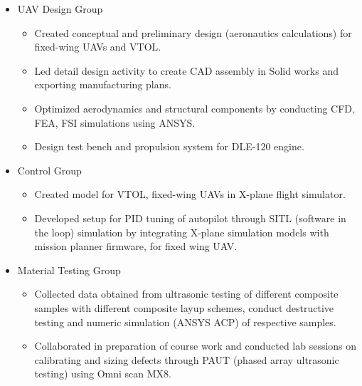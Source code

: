 \documentclass[margin, 10pt]{res} %
\begin{document}
\begin{resume}
\begin{itemize}
\item UAV Design Group

   \begin{itemize}
    \item Created conceptual and preliminary design (aeronautics calculations) for fixed-wing UAVs and VTOL. 
    \item Led detail design activity to create CAD assembly in Solid works and exporting manufacturing plans.
    \item Optimized aerodynamics and structural components by conducting CFD, FEA, FSI simulations using ANSYS. %
    \item Design test bench and propulsion system for DLE-120 engine. 
    \end{itemize}

\item Control Group

    \begin{itemize}
    \item Created model for VTOL, fixed-wing UAVs in X-plane flight simulator.
    \item Developed setup for PID tuning of autopilot through SITL (software in the loop) simulation by integrating X-plane simulation models with mission planner firmware, for fixed wing UAV.
    \end{itemize} 
    


\item Material Testing Group

    \begin{itemize}
    \item Collected data obtained from ultrasonic testing of different composite samples with different composite layup schemes, conduct destructive testing  and numeric simulation (ANSYS ACP) of respective samples.
    \item Collaborated in preparation of course work and conducted lab sessions on calibrating and sizing defects through PAUT (phased array ultrasonic testing) using Omni scan MX8. 
    \end{itemize} 
    
\end{itemize} 



\end{resume}
\end{document}
